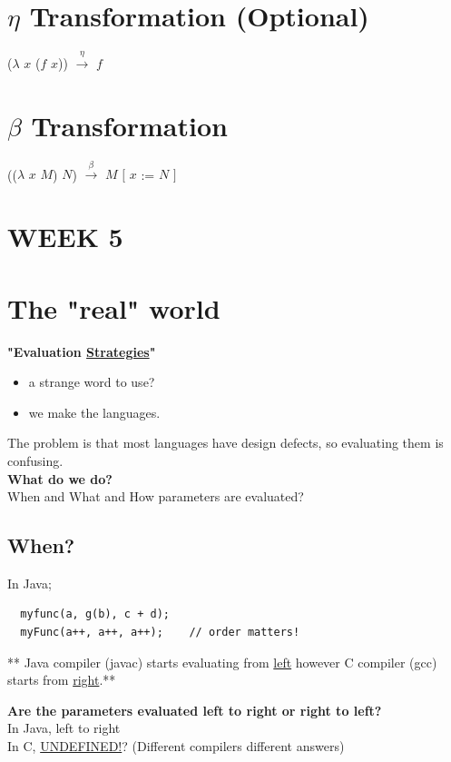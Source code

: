 \documentclass{article}
\begin{document}
\begin{flushleft}
\section*{$\eta$ Transformation (Optional)}
($\lambda$ $\mathit{x}$ ($\mathit{f}$ $\mathit{x}$)) $\xrightarrow{\eta}$ $\mathit{f}$

\section*{$\beta$ Transformation}
(($\lambda$ $\mathit{x}$ $\mathit{M}$) $\mathit{N}$) $\xrightarrow{\beta}$ $\mathit{M}$ $\mathit{[}$ $\mathit{x}$ := $\mathit{N}$ $\mathit{]}$
\end{flushleft}
\begin{flushleft}
\bigskip
\section*{WEEK 5}
\section*{The "real" world}
\begin{flushleft}
\textbf{"Evaluation \underline{Strategies}"}\\
\begin{itemize}
 \item a strange word to use?
 \item we make the languages.
\end{itemize}
The problem is that most languages have design defects, so evaluating them is confusing.\\
\bigskip
\textbf{What do we do?}\\
When and What and How parameters are evaluated?
\end{flushleft}

\subsection*{When?}
In Java;
\begin{verbatim}
  myfunc(a, g(b), c + d);
  myFunc(a++, a++, a++);	// order matters!
\end{verbatim}
** Java compiler (javac) starts evaluating from \underline{left} however C compiler (gcc) starts from \underline{right}.**\\
\bigskip

\textbf{Are the parameters evaluated left to right or right to left?}\\
In Java, left to right\\
In C, \underline{UNDEFINED!}? (Different compilers different answers)



\end{flushleft}
\end{document}
